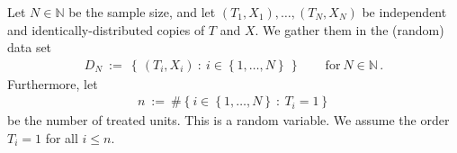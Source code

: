 Let  $N\in\mathbb{N}$ be the sample size, and let $(T_1,X_1),\ldots,(T_N,X_N)$ be independent and identically-distributed copies of $T$ and $X$. 
We gather them in the (random) data set 
\begin{gather*}
D_N
\ 
:=
\ 
\left\{\, (T_i,X_i)\ \colon\  i\in \left\{ 1,\ldots,N \right\}\, \right\}
\qquad
\text{for}\ N\in\mathbb{N}
\,.
\end{gather*}
Furthermore, let 
\begin{gather*}
  n
  \ 
  :=
  \ 
  \# 
  \left\{ 
    i\in \left\{ 1,\ldots,N \right\}
    \ 
    \colon
    \ 
    T_i=1
  \right\}
\end{gather*}
be the number of treated units. This is a random variable. We assume the order $T_i=1$ for all $i\le n$.
